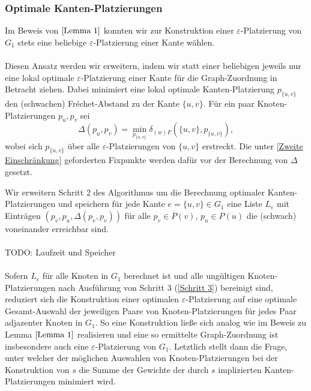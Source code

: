 \documentclass[a4paper, 12pt, twoside]{article}
\theoremstyle{Format1} %
\begin{document}
\subsubsection{Optimale Kanten-Platzierungen}
Im Beweis von $\ref{Lemma 1}$ konnten wir zur Konstruktion einer $\varepsilon$-Platzierung von $G_1$ stets eine beliebige $\varepsilon$-Platzierung einer Kante wählen.
\\
\\
Diesen Ansatz werden wir erweitern, indem wir statt einer beliebigen jeweils nur eine lokal optimale $\varepsilon$-Platzierung einer Kante für die Graph-Zuordnung in Betracht ziehen.
Dabei minimiert eine lokal optimale Kanten-Platzierung $p_{\{u,v\}}$ den (schwachen) Fréchet-Abstand zu der Kante $\{u,v\}$.
Für ein paar Knoten-Platzierungen $p_u, p_v$ sei $$\Delta(p_u,p_v) = \min_{p_{{\{u,v}\}}} \delta_{(w)F}(\{u,v\},p_{\{u,v\}}),$$ wobei sich $p_{{\{u,v}\}}$ über alle
$\varepsilon$-Platzierungen von $\{u,v\}$ erstreckt. Die unter \ref{Zweite Einschränkung} geforderten Fixpunkte werden dafür vor der Berechnung von $\Delta$ gesetzt.

Wir erweitern Schritt 2 des Algorithmus um die Berechnung optimaler Kanten-Platzierungen und speichern für jede Kante $e=\{u,v\} \in G_1$ eine Liste $L_e$
mit Einträgen $(p_v, p_u, \Delta(p_v,p_v))$ für alle $p_v \in P(v)$, $p_u \in P(u)$ die (schwach) voneinander erreichbar sind.
\\
\\
TODO: Laufzeit und Speicher
\\
\\
Sofern $L_e$ für alle Knoten in $G_1$ berechnet ist und alle ungültigen Knoten-Platzierungen nach Ausführung von Schritt 3 (\ref{Schritt 3}) bereinigt sind,
reduziert sich die Konstruktion einer optimalen $\varepsilon$-Platzierung auf eine optimale Gesamt-Auswahl der jeweiligen Paare von Knoten-Platzierungen für jedes Paar adjazenter Knoten in $G_1$.
So eine Konstruktion ließe sich analog wie im Beweis zu Lemma $\ref{Lemma 1}$ realisieren und eine so ermittelte Graph-Zuordnung ist insbesondere auch eine $\varepsilon$-Platzierung von $G_1$.
Letztlich stellt dann die Frage, unter welcher der möglichen Auswahlen von Knoten-Platzierungen bei der Konstruktion von $s$ die Summe der Gewichte der durch $s$ implizierten Kanten-Platzierungen minimiert wird.
\end{document}
